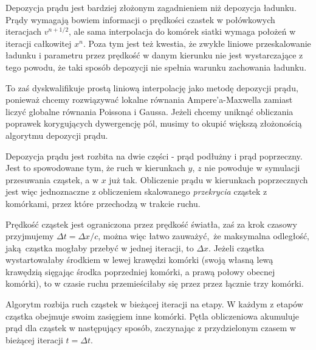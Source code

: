 Depozycja prądu jest bardziej złożonym zagadnieniem niż depozycja ładunku.
Prądy wymagają bowiem informacji o prędkości czastek w połówkowych
iteracjach $v^{n+1/2}$, ale sama interpolacja do komórek siatki wymaga
położeń w iteracji całkowitej $x^{n}$. Poza tym jest też kwestia, że zwykłe
liniowe przeskalowanie ładunku i parametru  przez prędkość w
danym kierunku nie jest wystarczające z tego powodu, że taki sposób
depozycji nie spełnia warunku zachowania ładunku.



To zaś dyskwalifikuje prostą liniową interpolację jako metodę depozycji
prądu, ponieważ chcemy rozwiązywać lokalne równania Ampere'a-Maxwella
zamiast liczyć globalne równania Poissona i Gaussa.
Jeżeli chcemy uniknąć obliczania poprawek korygujących dywergencję pól,
musimy to okupić większą złożonością algorytmu depozycji prądu.

Depozycja prądu jest rozbita na dwie części - prąd podłużny i prąd
poprzeczny. Jest to spowodowane tym, że ruch w kierunkach $y$, $z$ nie
powoduje w symulacji przesuwania cząstek, a w $x$ już tak. Obliczenie prądu
w kierunkach poprzecznych jest więc jednoznaczne z obliczeniem skalowanego
\emph{przekrycia} cząstek z komórkami, przez które przechodzą w trakcie
ruchu.

Prędkość cząstek jest ograniczona przez prędkość światła, zaś za krok czasowy
przyjmujemy $\Delta t = \Delta x/c$, można więc łatwo zauważyć, że maksymalna
odległość, jaką cząstka mogłaby przebyć w jednej iteracji, to $\Delta x$.
Jeżeli cząstka wystartowałaby środkiem w lewej krawędzi komórki (swoją
własną lewą krawędzią sięgając środka poprzedniej komórki, a prawą połowy
obecnej komórki), to w czasie ruchu przemieściłaby się przez
przez łącznie trzy komórki.  %

Algorytm rozbija ruch cząstek w bieżącej iteracji na etapy. W każdym z
etapów cząstka obejmuje swoim zasięgiem inne komórki. Pętla obliczeniowa
akumuluje prąd dla cząstek w następujący sposób, zaczynając z przydzielonym
czasem w bieżącej iteracji $t = \Delta t$.

